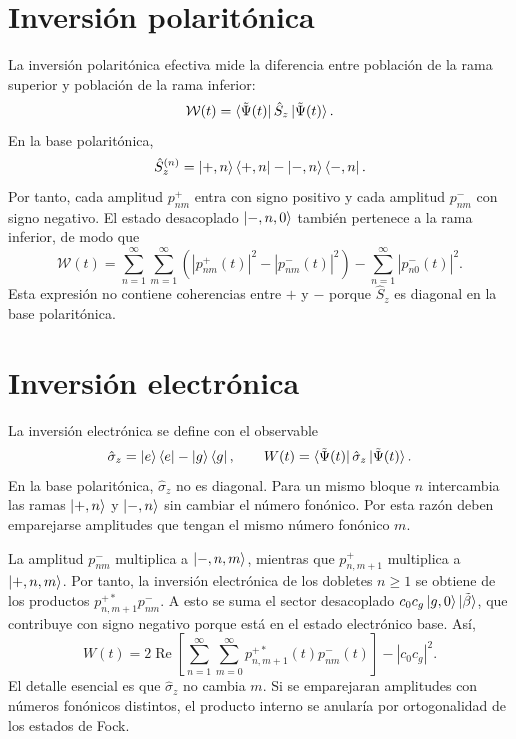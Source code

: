 \documentclass[11pt]{article}
\begin{document}
\section{Inversi\'on polarit\'onica}

La inversi\'on polarit\'onica efectiva mide la diferencia entre poblaci\'on de
la rama superior y poblaci\'on de la rama inferior:
\begin{equation}
  \mathcal W(t)
  =
  \bra{\tilde\Psi(t)}
  \hat S_z
  \ket{\tilde\Psi(t)}.
\end{equation}
En la base polarit\'onica,
\begin{equation}
  \hat S_z^{(n)}
  =
  \ket{+,n}\bra{+,n}
  -
  \ket{-,n}\bra{-,n}.
\end{equation}
Por tanto, cada amplitud $p_{nm}^{+}$ entra con signo positivo y cada amplitud
$p_{nm}^{-}$ con signo negativo. El estado desacoplado $\ket{-,n,0}$ tambi\'en
pertenece a la rama inferior, de modo que
\begin{equation}
  \boxed{
  \mathcal W(t)
  =
  \sum_{n=1}^{\infty}
  \sum_{m=1}^{\infty}
  \left(
  |p_{nm}^{+}(t)|^2
  -
  |p_{nm}^{-}(t)|^2
  \right)
  -
  \sum_{n=1}^{\infty}
  |p_{n0}^{-}(t)|^2.
  }
\end{equation}
Esta expresi\'on no contiene coherencias entre $+$ y $-$ porque
$\hat S_z$ es diagonal en la base polarit\'onica.

\section{Inversi\'on electr\'onica}

La inversi\'on electr\'onica se define con el observable
\begin{equation}
  \hat\sigma_z
  =
  \ket e\bra e-\ket g\bra g,
  \qquad
  W(t)
  =
  \bra{\tilde\Psi(t)}
  \hat\sigma_z
  \ket{\tilde\Psi(t)}.
\end{equation}
En la base polarit\'onica, $\hat\sigma_z$ no es diagonal. Para un mismo bloque
$n$ intercambia las ramas $\ket{+,n}$ y $\ket{-,n}$ sin cambiar el n\'umero
fon\'onico. Por esta raz\'on deben emparejarse amplitudes que tengan el mismo
n\'umero fon\'onico $m$.

La amplitud $p_{nm}^{-}$ multiplica a $\ket{-,n,m}$, mientras que
$p_{n,m+1}^{+}$ multiplica a $\ket{+,n,m}$. Por tanto, la inversi\'on
electr\'onica de los dobletes $n\geq1$ se obtiene de los productos
$p_{n,m+1}^{+*}p_{nm}^{-}$. A esto se suma el sector desacoplado
$c_0c_g\ket{g,0}\ket{\tilde\beta}$, que contribuye con signo negativo porque
est\'a en el estado electr\'onico base. As\'i,
\begin{equation}
  \boxed{
  W(t)
  =
  2\operatorname{Re}
  \left[
  \sum_{n=1}^{\infty}
  \sum_{m=0}^{\infty}
  p_{n,m+1}^{+*}(t)p_{nm}^{-}(t)
  \right]
  -
  |c_0c_g|^2.
  }
\end{equation}
El detalle esencial es que $\hat\sigma_z$ no cambia $m$. Si se emparejaran
amplitudes con n\'umeros fon\'onicos distintos, el producto interno se anular\'ia
por ortogonalidad de los estados de Fock.
\end{document}
